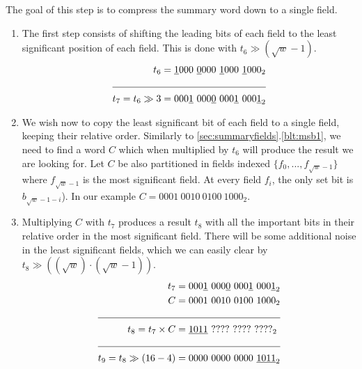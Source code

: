 The goal of this step is to compress the summary word down to a single field.

\begin{enumerate}
    \item \label{blt:summCompression1}
    The first step consists of shifting the leading bits of each field to the least significant position of each field. This is done with $t_6 \gg (\sqrt{w} - 1)$. 
    \begin{align*}
                    t_6 &= \underline{1}000\ \underline{0}000\ \underline{1}000\ \underline{1}000_2 \\ \cline{1-2} 
        t_7 = t_6 \gg 3 &= 000\underline{1}\ 000\underline{0}\ 000\underline{1}\ 000\underline{1}_2
    \end{align*}
    
    \item \label{blt:summCompression2}
    We wish now to copy the least significant bit of each field to a single field, keeping their relative order.
    Similarly to \ref{sec:summaryfields}.\ref{blt:msb1}, we need to find a word $C$ which when multiplied by $t_6$ will produce the result we are looking for.
    Let $C$ be also partitioned in fields indexed $\{f_0, ..., f_{\sqrt{w} - 1}\}$ where $f_{\sqrt{w} - 1}$ is the most significant field. At every field $f_i$, the only set bit is $b_{\sqrt{w} - 1 - i}$).
    In our example $C = 0001\ 0010\ 0100\ 1000_2$.
    
    \item \label{blt:summCompression3}
    Multiplying $C$ with $t_7$ produces a result $t_8$ with all the important bits in their relative order in the most significant field. There will be some additional noise in the least significant fields, which we can easily clear by $t_8 \gg ((\sqrt{w})\cdot(\sqrt{w} - 1))$.
        \begin{align*}
                         t_7 &= 000\underline{1}\ 000\underline{0}\ 000\underline{1}\ 000\underline{1}_2 \\
                           C &= 0001\ 0010\ 0100\ 1000_2 \\ \cline{1-2} 
          t_8 = t_7 \times C &= \underline{1011}\ ????\ ????\ ????_2\\ \cline{1-2}
        t_9 = t_8 \gg (16-4) &= 0000\ 0000\ 0000\ \underline{1011}_2
    \end{align*}
\end{enumerate}

